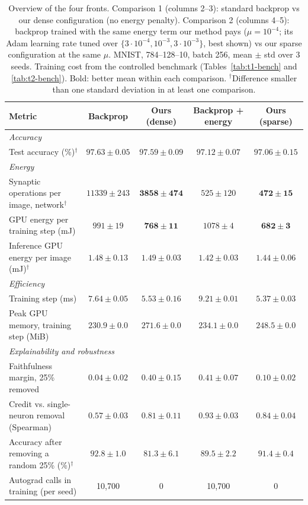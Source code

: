 \documentclass{article}
\begin{document}
\begin{table}[H]
\centering
\small
\caption{Overview of the four fronts. Comparison 1 (columns 2--3): standard backprop vs our dense configuration (no energy penalty). Comparison 2 (columns 4--5): backprop trained with the same energy term our method pays ($\mu = 10^{-4}$; its Adam learning rate tuned over $\{3\cdot10^{-4}, 10^{-3}, 3\cdot10^{-3}\}$, best shown) vs our sparse configuration at the same $\mu$. MNIST, 784--128--10, batch 256, mean $\pm$ std over 3 seeds. Training cost from the controlled benchmark (Tables~\ref{tab:t1-bench} and \ref{tab:t2-bench}). Bold: better mean within each comparison. $^\dagger$Difference smaller than one standard deviation in at least one comparison.}
\label{tab:overview}
\begin{tabular}{lcccc}
\toprule
Metric & Backprop & Ours (dense) & Backprop + energy & Ours (sparse) \\
\midrule
\multicolumn{5}{l}{\textit{Accuracy}} \\
Test accuracy (\%)$^\dagger$ & $\boldsymbol{97.63 \pm 0.05}$ & $97.59 \pm 0.09$ & $\boldsymbol{97.12 \pm 0.07}$ & $97.06 \pm 0.15$ \\
\multicolumn{5}{l}{\textit{Energy}} \\
Synaptic operations per image, network$^\dagger$ & $11339 \pm 243$ & $\boldsymbol{3858 \pm 474}$ & $525 \pm 120$ & $\boldsymbol{472 \pm 15}$ \\
GPU energy per training step (mJ) & $991 \pm 19$ & $\boldsymbol{768 \pm 11}$ & $1078 \pm 4$ & $\boldsymbol{682 \pm 3}$ \\
Inference GPU energy per image (mJ)$^\dagger$ & $\boldsymbol{1.48 \pm 0.13}$ & $1.49 \pm 0.03$ & $\boldsymbol{1.42 \pm 0.03}$ & $1.44 \pm 0.06$ \\
\multicolumn{5}{l}{\textit{Efficiency}} \\
Training step (ms) & $7.64 \pm 0.05$ & $\boldsymbol{5.53 \pm 0.16}$ & $9.21 \pm 0.01$ & $\boldsymbol{5.37 \pm 0.03}$ \\
Peak GPU memory, training step (MiB) & $\boldsymbol{230.9 \pm 0.0}$ & $271.6 \pm 0.0$ & $\boldsymbol{234.1 \pm 0.0}$ & $248.5 \pm 0.0$ \\
\multicolumn{5}{l}{\textit{Explainability and robustness}} \\
Faithfulness margin, 25\% removed & $0.04 \pm 0.02$ & $\boldsymbol{0.40 \pm 0.15}$ & $\boldsymbol{0.41 \pm 0.07}$ & $0.10 \pm 0.02$ \\
Credit vs. single-neuron removal (Spearman) & $0.57 \pm 0.03$ & $\boldsymbol{0.81 \pm 0.11}$ & $\boldsymbol{0.93 \pm 0.03}$ & $0.84 \pm 0.04$ \\
Accuracy after removing a random 25\% (\%)$^\dagger$ & $\boldsymbol{92.8 \pm 1.0}$ & $81.3 \pm 6.1$ & $89.5 \pm 2.2$ & $\boldsymbol{91.4 \pm 0.4}$ \\
\midrule
Autograd calls in training (per seed) & 10{,}700 & 0 & 10{,}700 & 0 \\
\bottomrule
\end{tabular}
\end{table}
\end{document}
